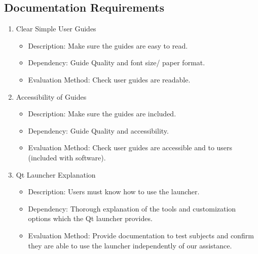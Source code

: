 \documentclass[a4paper,10pt]{article}
\begin{document}
	\subsection{Documentation Requirements}
	\begin{enumerate}
	  \item Clear Simple User Guides	%
	  \begin{itemize}
	    \item Description: Make sure the guides are easy to read.
	    \item  Dependency: Guide Quality and font size/ paper format.
	    \item Evaluation Method: Check user guides are readable.
	  \end{itemize}
	\item Accessibility of Guides
	  \begin{itemize}
	    \item Description: Make sure the guides are included. %
	    \item  Dependency: Guide Quality and accessibility.  
	    \item Evaluation Method: Check user guides are accessible and to users (included with software).
	  \end{itemize}
	\item Qt Launcher Explanation
	\begin{itemize}
			\item Description: Users must know how to use the launcher.
			\item  Dependency: Thorough explanation of the tools and customization options which the Qt launcher provides.  
			\item Evaluation Method: Provide documentation to test subjects and confirm they are able to use the launcher independently of our assistance.
	\end{itemize}
	\end{enumerate}

	
	
\pagebreak
\end{document}
